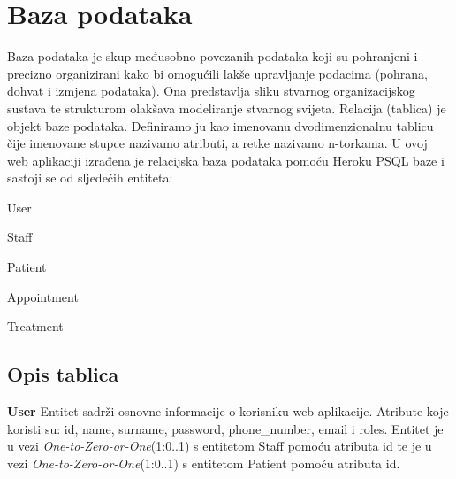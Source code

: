 		\pagebreak		
		\section{Baza podataka}
			
			
		Baza podataka je skup međusobno povezanih podataka koji su pohranjeni i precizno organizirani kako bi omogućili lakše upravljanje podacima (pohrana, dohvat i izmjena podataka). Ona predstavlja sliku stvarnog organizacijskog sustava te strukturom olakšava modeliranje stvarnog svijeta. Relacija (tablica) je objekt baze podataka. Definiramo ju kao imenovanu dvodimenzionalnu tablicu čije imenovane stupce nazivamo atributi, a retke nazivamo n-torkama. U ovoj web aplikaciji izrađena je relacijska baza podataka pomoću Heroku PSQL baze i sastoji se od sljedećih entiteta:
		\begin{packed_item}
			\item User
			\item Staff
			\item Patient
			\item Appointment
			\item Treatment
		\end{packed_item}	
		
			\subsection{Opis tablica}
			

				
				\textbf{User} Entitet sadrži osnovne informacije o korisniku web aplikacije. Atribute koje koristi su: id, name, surname, password, phone\_number, email i roles. Entitet je u vezi \textit{One-to-Zero-or-One}(1:0..1) s entitetom Staff pomoću atributa id te je u vezi \textit{One-to-Zero-or-One}(1:0..1) s entitetom Patient pomoću atributa id.
				
